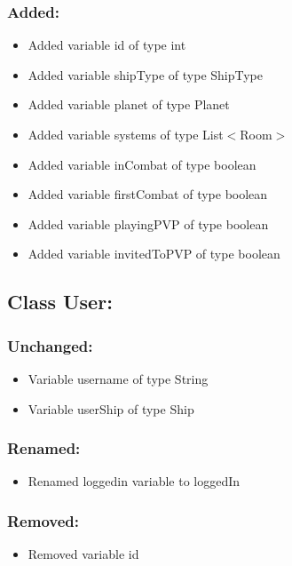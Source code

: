\documentclass{article}
\begin{document}
\subsubsection{Added:}
\begin{itemize}
\item Added variable id of type int
\item Added variable shipType of type ShipType
\item Added variable planet of type Planet
\item Added variable systems of type List$<$Room$>$
\item Added variable inCombat of type boolean
\item Added variable firstCombat of type boolean
\item Added variable playingPVP of type boolean
\item Added variable invitedToPVP of type boolean
\end{itemize}


\subsection{Class User:}

\subsubsection{Unchanged:}
\begin{itemize}
\item Variable username of type String
\item Variable userShip of type Ship
\end{itemize}

\subsubsection{Renamed:}
\begin{itemize}
\item Renamed loggedin variable to loggedIn
\end{itemize}

\subsubsection{Removed:}
\begin{itemize}
\item Removed variable id
\end{itemize}
\end{document}
